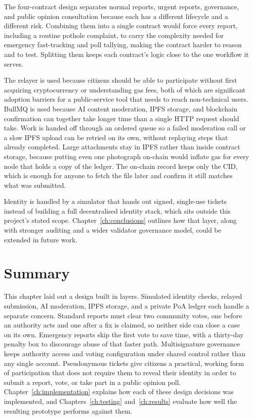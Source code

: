 The four-contract design separates normal reports, urgent reports, governance, and public opinion consultation because each has a different lifecycle and a different risk. Combining them into a single contract would force every report, including a routine pothole complaint, to carry the complexity needed for emergency fast-tracking and poll tallying, making the contract harder to reason and to test. Splitting them keeps each contract's logic close to the one workflow it serves.

The relayer is used because citizens should be able to participate without first acquiring cryptocurrency or understanding gas fees, both of which are significant adoption barriers for a public-service tool that needs to reach non-technical users. BullMQ is used because AI content moderation, IPFS storage, and blockchain confirmation can together take longer time than a single HTTP request should take. 
Work is handed off through an ordered queue so a failed moderation call or a slow IPFS upload can be retried on its own, without replaying steps that already completed. Large attachments stay in \ac{IPFS} rather than inside contract storage, because putting even one photograph on-chain would inflate gas for every node that holds a copy of the ledger. The on-chain record keeps only the \ac{CID}, which is enough for anyone to fetch the file later and confirm it still matches what was submitted.

Identity is handled by a simulator that hands out signed, single-use tickets instead of building a full decentralised identity stack, which sits outside this project's stated scope. Chapter~\ref{ch:conclusions} outlines how that layer, along with stronger auditing and a wider validator governance model, could be extended in future work.

\section{Summary}
\label{sec:architecture-summary}

This chapter laid out a design built in layers. Simulated identity checks, relayed submission, \ac{AI} moderation, \ac{IPFS} storage, and a private \ac{PoA} ledger each handle a separate concern. Standard reports must clear two community votes, one before an authority acts and one after a fix is claimed, so neither side can close a case on its own. Emergency reports skip the first vote to save time, with a thirty-day penalty box to discourage abuse of that faster path.
Multisignature governance keeps authority access and voting configuration under shared control rather than any single account. Pseudonymous tickets give citizens a practical, working form of participation that does not require them to reveal their identity in order to submit a report, vote, or take part in a public opinion poll. Chapter~\ref{ch:implementation} explains how each of these design decisions was implemented, and Chapters~\ref{ch:testing} and~\ref{ch:results} evaluate how well the resulting prototype performs against them.
